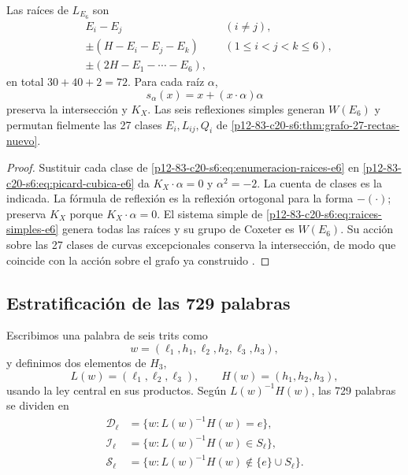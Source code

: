 \begin{proposition}
\label{p12-83-c20-s6:prop:setenta-dos-raices-e6}
Las raíces de \(L_{E_6}\) son
\begin{equation}
 \begin{aligned}
 &E_i-E_j &&(i\ne j),\\
 &\pm(H-E_i-E_j-E_k) &&(1\le i<j<k\le6),\\
 &\pm(2H-E_1-\cdots-E_6),
 \end{aligned}
 \label{p12-83-c20-s6:eq:enumeracion-raices-e6}
\end{equation}
en total \(30+40+2=72\). Para cada raíz \(\alpha\),
\begin{equation}
 s_\alpha(x)=x+(x\cdot\alpha)\alpha
 \label{p12-83-c20-s6:eq:reflexion-raiz-e6}
\end{equation}
preserva la intersección y \(K_X\). Las seis reflexiones simples generan
\(W(E_6)\) y permutan fielmente las 27 clases
\(E_i,L_{ij},Q_i\) de \cref{p12-83-c20-s6:thm:grafo-27-rectas-nuevo}.
\end{proposition}

\begin{proof}
Sustituir cada clase de \cref{p12-83-c20-s6:eq:enumeracion-raices-e6} en
\cref{p12-83-c20-s6:eq:picard-cubica-e6} da \(K_X\cdot\alpha=0\) y
\(\alpha^2=-2\). La cuenta de clases es la indicada. La fórmula de reflexión
es la reflexión ortogonal para la forma \(-(\cdot)\); preserva \(K_X\) porque
\(K_X\cdot\alpha=0\). El sistema simple de
\cref{p12-83-c20-s6:eq:raices-simples-e6} genera todas las raíces y su grupo de Coxeter es
\(W(E_6)\). Su acción sobre las 27 clases de curvas excepcionales conserva la
intersección, de modo que coincide con la acción sobre el grafo ya
construido \cite{Manivel2005}.
\end{proof}

\subsection{Estratificación de las 729 palabras}

Escribimos una palabra de seis trits como
\[
 w=(\ell_1,h_1,\ell_2,h_2,\ell_3,h_3),
\]
y definimos dos elementos de \(H_3\),
\[
 L(w)=(\ell_1,\ell_2,\ell_3),\qquad
 H(w)=(h_1,h_2,h_3),
\]
usando la ley central en sus productos. Según
\(L(w)^{-1}H(w)\), las 729 palabras se dividen en
\begin{align*}
 \mathcal D_\ell&=\{w:L(w)^{-1}H(w)=e\},\\
 \mathcal I_\ell&=\{w:L(w)^{-1}H(w)\in S_\ell\},\\
 \mathcal S_\ell&=\{w:L(w)^{-1}H(w)\notin\{e\}\cup S_\ell\}.
\end{align*}

